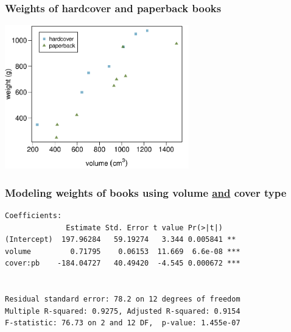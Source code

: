 
\begin{frame}
\frametitle{Weights of hardcover and paperback books}



\begin{center}
\includegraphics[width=0.6\textwidth]{8-1_intro_mlr/figures/books/weight_volume_cover}
\end{center}

\end{frame}


\begin{frame}[fragile]
\frametitle{Modeling weights of books using volume \underline{and} cover type}

\begin{verbatim}
Coefficients:
              Estimate Std. Error t value Pr(>|t|)    
(Intercept)  197.96284   59.19274   3.344 0.005841 ** 
volume         0.71795    0.06153  11.669  6.6e-08 ***
cover:pb    -184.04727   40.49420  -4.545 0.000672 ***


Residual standard error: 78.2 on 12 degrees of freedom
Multiple R-squared: 0.9275,	Adjusted R-squared: 0.9154 
F-statistic: 76.73 on 2 and 12 DF,  p-value: 1.455e-07 
\end{verbatim}

\end{frame}


